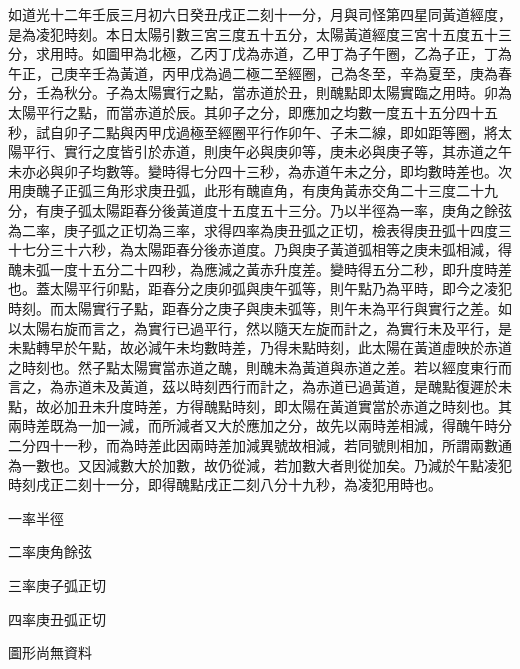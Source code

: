 \begin{pinyinscope}
如道光十二年壬辰三月初六日癸丑戌正二刻十一分，月與司怪第四星同黃道經度，是為凌犯時刻。本日太陽引數三宮三度五十五分，太陽黃道經度三宮十五度五十三分，求用時。如圖甲為北極，乙丙丁戊為赤道，乙甲丁為子午圈，乙為子正，丁為午正，己庚辛壬為黃道，丙甲戊為過二極二至經圈，己為冬至，辛為夏至，庚為春分，壬為秋分。子為太陽實行之點，當赤道於丑，則醜點即太陽實臨之用時。卯為太陽平行之點，而當赤道於辰。其卯子之分，即應加之均數一度五十五分四十五秒，試自卯子二點與丙甲戊過極至經圈平行作卯午、子未二線，即如距等圈，將太陽平行、實行之度皆引於赤道，則庚午必與庚卯等，庚未必與庚子等，其赤道之午未亦必與卯子均數等。變時得七分四十三秒，為赤道午未之分，即均數時差也。次用庚醜子正弧三角形求庚丑弧，此形有醜直角，有庚角黃赤交角二十三度二十九分，有庚子弧太陽距春分後黃道度十五度五十三分。乃以半徑為一率，庚角之餘弦為二率，庚子弧之正切為三率，求得四率為庚丑弧之正切，檢表得庚丑弧十四度三十七分三十六秒，為太陽距春分後赤道度。乃與庚子黃道弧相等之庚未弧相減，得醜未弧一度十五分二十四秒，為應減之黃赤升度差。變時得五分二秒，即升度時差也。蓋太陽平行卯點，距春分之庚卯弧與庚午弧等，則午點乃為平時，即今之凌犯時刻。而太陽實行子點，距春分之庚子與庚未弧等，則午未為平行與實行之差。如以太陽右旋而言之，為實行已過平行，然以隨天左旋而計之，為實行未及平行，是未點轉早於午點，故必減午未均數時差，乃得未點時刻，此太陽在黃道虛映於赤道之時刻也。然子點太陽實當赤道之醜，則醜未為黃道與赤道之差。若以經度東行而言之，為赤道未及黃道，茲以時刻西行而計之，為赤道已過黃道，是醜點復遲於未點，故必加丑未升度時差，方得醜點時刻，即太陽在黃道實當於赤道之時刻也。其兩時差既為一加一減，而所減者又大於應加之分，故先以兩時差相減，得醜午時分二分四十一秒，而為時差此因兩時差加減異號故相減，若同號則相加，所謂兩數通為一數也。又因減數大於加數，故仍從減，若加數大者則從加矣。乃減於午點凌犯時刻戌正二刻十一分，即得醜點戌正二刻八分十九秒，為凌犯用時也。

一率半徑

二率庚角餘弦

三率庚子弧正切

四率庚丑弧正切

圖形尚無資料


\end{pinyinscope}
